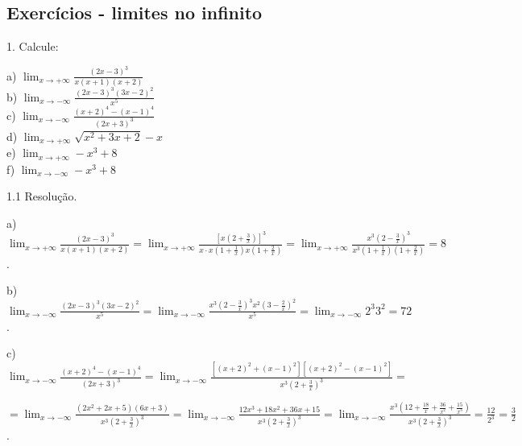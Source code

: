 \documentclass{article}
\begin{document}
{\begin{newpage}
\subsection{Exercícios - limites no infinito}
\par
\begin{flushleft}
1. Calcule:
\end{flushleft}
\par
\begin{multicols}{3}
\hspace{-15pt}a) $\displaystyle{\lim_{x\to +\infty }} \frac{(2x - 3)^3}{x(x+1)(x+2)}$\\
b) $\displaystyle{\lim_{x\to -\infty }} \frac{(2x-3)^{3}(3x-2)^{2}}{x^5}$
\\
c) $\displaystyle{\lim_{x\to -\infty }} \frac{(x+2)^{4} - (x-1)^{4}}{(2x+3)^{3}}$\\
d) $\displaystyle{\lim_{x\to +\infty }} \sqrt{x^2 + 3x + 2} - x$\\
e) $\displaystyle{\lim_{x\to +\infty }} -x^3 + 8$\\
f) $\displaystyle{\lim_{x\to -\infty }} -x^3 + 8$
\end{multicols}
\par
\vspace{0.3cm}
\begin{flushleft}
1.1 Resolução.
\end{flushleft}
\par
a) $\displaystyle{\lim_{x\to +\infty } \frac{(2x - 3)^3}{x(x+1)(x+2)} = \lim_{x\to +\infty } \frac{[x(2 + \frac{3}{x})]^3}{x\cdot x(1+\frac{1}{x})x(1+\frac{2}{x})} = \lim_{x\to +\infty } \frac{x^{3}(2-\frac{3}{x})^3}{x{^3}(1+\frac{1}{x})(1+\frac{2}{x})} = 8}$.
\par
\vspace{0.3cm}
b) $\displaystyle{\lim_{x\to -\infty } \frac{(2x-3)^{3}(3x-2)^{2}}{x^5} = \lim_{x\to -\infty } \frac{x^{3}(2-\frac{3}{x})^{3}x^{2}(3-\frac{2}{x})^{2}}{x^5} = \lim_{x\to -\infty } 2^{3}3^{2} = 72}$.
\par
\vspace{0.3cm}
c) $\displaystyle{\lim_{x\to -\infty } \frac{(x+2)^{4} - (x-1)^{4}}{(2x+3)^{3}} = \lim_{x\to -\infty } \frac{[(x+2)^{2} + (x-1)^{2}][(x+2)^{2} - (x-1)^{2}]}{x^{3}(2+\frac{3}{x})^{3}} =}$\par$\displaystyle{= \lim_{x\to -\infty } \frac{(2x^{2} + 2x + 5)(6x+3)}{x^{3}(2+\frac{3}{x})^{3}} = \lim_{x\to -\infty } \frac{12x^3 + 18x^2 + 36x + 15}{x^{3}(2+\frac{3}{x})^{3}} = \lim_{x\to -\infty } \frac{x^{3}(12 + \frac{18}{x} + \frac{36}{x^2} + \frac{15}{x^3})}{x^{3}(2+\frac{3}{x})^{3}} = \frac{12}{2^3} = \frac{3}{2}}$.

\end{newpage}}
\end{document}
